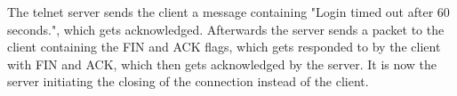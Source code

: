 The telnet server sends the client a message containing "Login timed out after 60 seconds.", which gets acknowledged. Afterwards the server sends a packet to the client containing the FIN and ACK flags, which gets responded to by the client with FIN and ACK, which then gets acknowledged by the server. It is now the server initiating the closing of the connection instead of the client.